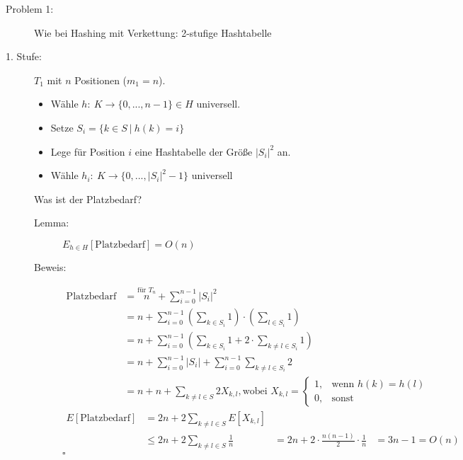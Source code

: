 \begin{description}
\begin{description}
  \item[Problem 1:] Wie bei Hashing mit Verkettung: 2-stufige Hashtabelle
  \item[1. Stufe:] $T_1$ mit $n$ Positionen ($m_1 = n$).
      \begin{itemize}
       \item Wähle $h{:}\ K \to \{0, ..., n - 1\} \in H$ universell.
       \item Setze $S_i = \{k \in S\ |\ h(k) = i\}$
       \item Lege für Position $i$ eine Hashtabelle der Größe $|S_i|^2$ an.
       \item Wähle $h_i{:}\ K \to \{0, ..., |S_i|^2 - 1\}$ universell
      \end{itemize}
      Was ist der Platzbedarf?
      \begin{description}
       \item[Lemma:] $E_{h \in H}[\text{Platzbedarf}] = O(n)$
       \item[Beweis:] \begin{align*}
                       \text{Platzbedarf} &= \overset{\text{für $T_n$}}{n} + \sum\limits_{i = 0}^{n-1} |S_i|^2 \\
                            &= n + \sum\limits_{i = 0}^{n - 1} \left(\sum\limits_{k \in S_i} 1\right) \cdot \left(\sum\limits_{l \in S_i} 1\right) \\
                            &= n + \sum\limits_{i = 0}^{n - 1} \left(\sum\limits_{k \in S_i} 1 + 2 \cdot \sum\limits_{k \neq l \in S_i} 1\right)\\
                            &= n + \sum\limits_{i = 0}^{n - 1} |S_i| + \sum\limits_{i = 0}^{n - 1} \sum\limits_{k \neq l \in S_i} 2\\
                            &= n + n + \sum_{k \neq l \in S} 2 X_{k,l}, \text{wobei $X_{k,l} = \begin{cases}1, &\text{wenn $h(k) = h(l)$}\\ 0, & \text{sonst}\end{cases}$}
                      \end{align*}
                      \begin{align*}
                       E[\text{Platzbedarf}] &= 2n + 2 \sum\limits_{k \neq l \in S} E[X_{k,l}] \\
                               &\leq 2n + 2 \sum_{k \neq l \in S} \frac{1}{n}
                               &= 2n + 2 \cdot \frac{n(n-1)}{2} \cdot \frac{1}{n}
                               &= 3n - 1 = O(n)
                      \end{align*} \hfill $\square$

\end{description}
\end{description}
\end{description}
